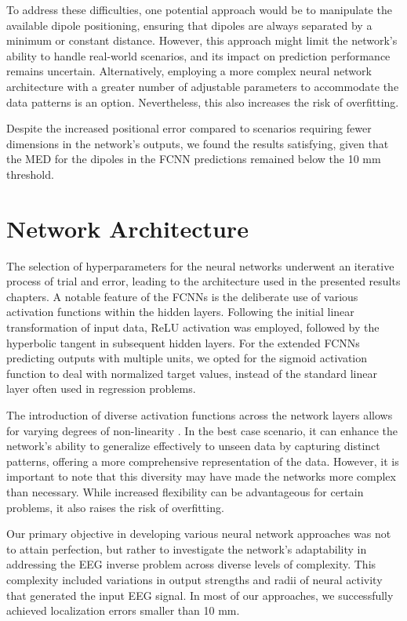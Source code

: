 \documentclass[a4paper, UKenglish, 11pt]{uiomaster}
\begin{document}
To address these difficulties, one potential approach would be to manipulate the available dipole positioning, ensuring that dipoles are always separated by a minimum or constant distance. However, this approach might limit the network's ability to handle real-world scenarios, and its impact on prediction performance remains uncertain. Alternatively, employing a more complex neural network architecture with a greater number of adjustable parameters to accommodate the data patterns is an option. Nevertheless, this also increases the risk of overfitting.

Despite the increased positional error compared to scenarios requiring fewer dimensions in the network's outputs, we found the results satisfying, given that the MED for the dipoles in the FCNN predictions remained below the 10 mm threshold.


\section{Network Architecture} \label{sec:architecture}
The selection of hyperparameters for the neural networks underwent an iterative process of trial and error, leading to the architecture used in the presented results chapters. A notable feature of the FCNNs is the deliberate use of various activation functions within the hidden layers. Following the initial linear transformation of input data, ReLU activation was employed, followed by the hyperbolic tangent in subsequent hidden layers. For the extended FCNNs predicting outputs with multiple units, we opted for the sigmoid activation function to deal with normalized target values, instead of the standard linear layer often used in regression problems.

The introduction of diverse activation functions across the network layers allows for varying degrees of non-linearity . In the best case scenario, it can enhance the network's ability to generalize effectively to unseen data by capturing distinct patterns, offering a more comprehensive representation of the data. However, it is important to note that this diversity may have made the networks more complex than necessary. While increased flexibility can be advantageous for certain problems, it also raises the risk of overfitting.

Our primary objective in developing various neural network approaches was not to attain perfection, but rather to investigate the network's adaptability in addressing the EEG inverse problem across diverse levels of complexity. This complexity included variations in output strengths and radii of neural activity that generated the input EEG signal. In most of our approaches, we successfully achieved localization errors smaller than 10 mm.
\end{document}

